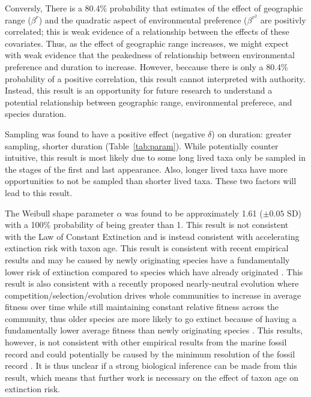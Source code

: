 \documentclass[11pt]{article}
\begin{document}
Conversly, There is a 80.4\% probability that estimates of the effect of geographic range (\(\beta^{r}\)) and the quadratic aspect of environmental preference (\(\beta^{v^{2}}\) are positivly correlated; this is weak evidence of a relationship between the effects of these covariates. Thus, as the effect of geographic range increases, we might expect with weak evidence that the peakedness of relationship between environmental preference and duration to increase. However, beccause there is only a 80.4\% probability of a positive correlation, this result cannot interpreted with authority. Instead, this result is an opportunity for future research to understand a potential relationship between geographic range, environmental preferece, and species duration.


Sampling was found to have a positive effect (negative \(\delta\)) on duration: greater sampling, shorter duration (Table~\ref{tab:param}). While potentially counter intuitive, this result is most likely due to some long lived taxa only be sampled in the stages of the first and last appearance. Also, longer lived taxa have more opportunities to not be sampled than shorter lived taxa. These two factors will lead to this result. 

The Weibull shape parameter \(\alpha\) was found to be approximately 1.61 (\(\pm 0.05\) SD) with a 100\% probability of being greater than 1. This result is not consistent with the Law of Constant Extinction \citep{VanValen1973} and is instead consistent with accelerating extinction risk with taxon age. This result is consistent with recent empirical results and may be caused by newly originating species have a fundamentally lower risk of extinction compared to species which have already originated \citep{Wagner2014b,Quental2013,Smits2015}. This result is also consistent with a recently proposed nearly-neutral evolution where competition/selection/evolution drives whole communities to increase in average fitness over time while still maintaining constant relative fitness across the community, thus older species are more likely to go extinct because of having a fundamentally lower average fitness than newly originating species \citep{Rosindell2015a}. This results, however, is not consistent with other empirical results from the marine fossil record \citep{Finnegan2008,Crampton2016} and could potentially be caused by the minimum resolution of the fossil record \citep{Sepkoski1975}. It is thus unclear if a strong biological inference can be made from this result, which means that further work is necessary on the effect of taxon age on extinction risk.
\end{document}
